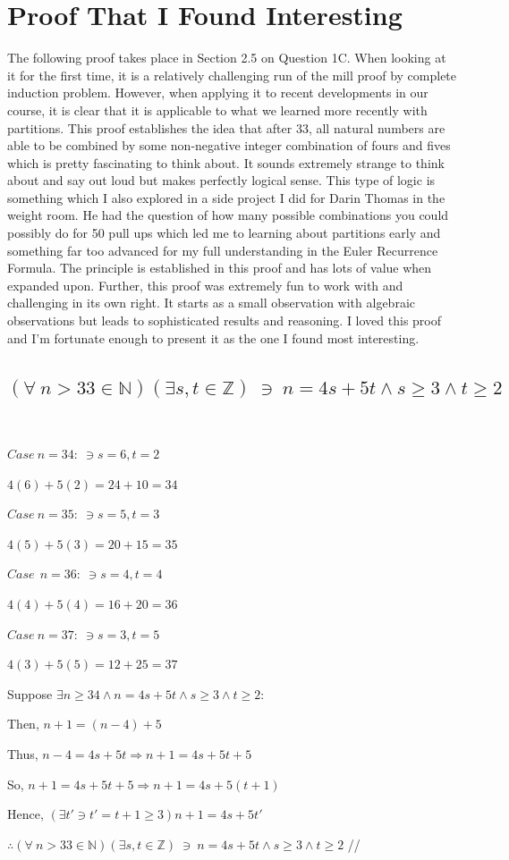 \documentclass{article}
\begin{document}
\section{Proof That I Found Interesting}
\justifying
The following proof takes place in Section 2.5 on Question 1C. When looking at it for the first time, it is a relatively challenging run of the mill proof by complete induction problem. However, when applying it to recent developments in our course, it is clear that it is applicable to what we learned more recently with partitions. This proof establishes the idea that after 33, all natural numbers are able to be combined by some non-negative integer combination of fours and fives which is pretty fascinating to think about. It sounds extremely strange to think about and say out loud but makes perfectly logical sense. This type of logic is something which I also explored in a side project I did for Darin Thomas in the weight room. He had the question of how many possible combinations you could possibly do for 50 pull ups which led me to learning about partitions early and something far too advanced for my full understanding in the Euler Recurrence Formula. The principle is established in this proof and has lots of value when expanded upon. Further, this proof was extremely fun to work with and challenging in its own right. It starts as a small observation with algebraic observations but leads to sophisticated results and reasoning. I loved this proof and I'm fortunate enough to present it as the one I found most interesting.
\newpage
\subsection{ $(\forall \ n>33 \in \mathbb{N}) (\exists s, t \in \mathbb{Z}) \ \ni \ n=4s+5t \wedge s \geq 3 \wedge t \geq 2$}
\
\begin{center}
\raggedright
$Case \ n=34: \ \ni  s=6, t=2$

$4(6)+5(2)=24+10=34$

$Case \ n=35: \ \ni s=5, t=3$

$4(5)+5(3)=20+15=35$

$Case \ \ n=36: \ \ni s=4, t=4$

$4(4)+5(4)=16+20=36$

$Case \ n=37: \ \ni s=3, t=5$

$4(3)+5(5)=12+25=37$

Suppose $\exists n \geq 34 \wedge n=4s+5t \wedge s \geq 3 \wedge t \geq 2$:

Then, $n+1=(n-4)+5$

Thus, $n-4=4s+5t \Rightarrow n+1=4s+5t+5$

So, $n+1=4s+5t+5 \Rightarrow n+1=4s+5(t+1)$

Hence, $(\exists t' \ni t'=t+1 \geq 3) n+1=4s+5t'$

$\therefore (\forall \ n>33 \in \mathbb{N}) (\exists s, t \in \mathbb{Z}) \ \ni \ n=4s+5t \wedge s \geq 3 \wedge t \geq 2$  //

\end{center}
\end{document}
